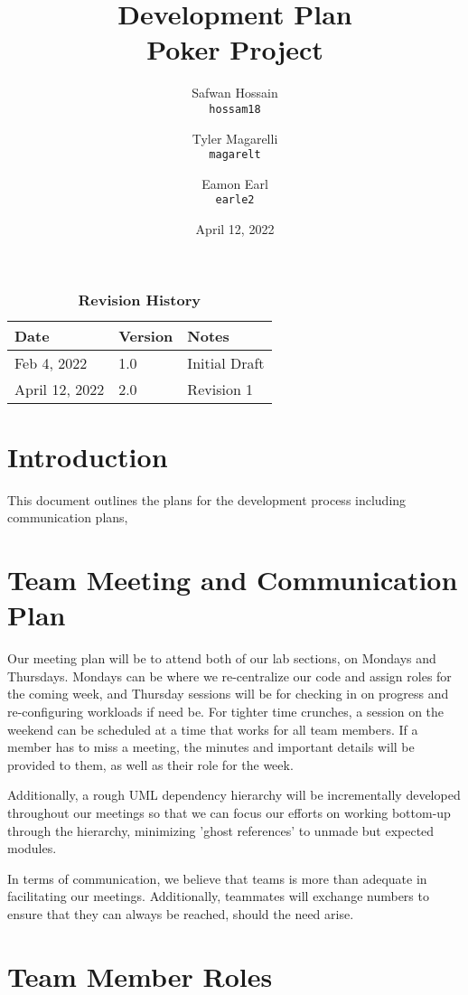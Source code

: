 \documentclass{article}
\title{Development Plan\\Poker Project}
\author{
  Safwan Hossain\\
  \texttt{hossam18}\\
  \and
  Tyler Magarelli\\
  \texttt{magarelt}\\
  \and
  Eamon Earl\\
  \texttt{earle2}
}
\date{April 12, 2022}
\begin{document}
\maketitle
\begin{table}[bp]
\caption{\bf Revision History}
\begin{tabularx}{\textwidth}{p{3cm}p{2cm}X}
\toprule {\bf Date} & {\bf Version} & {\bf Notes}\\
\midrule
Feb 4, 2022 & 1.0 & Initial Draft\\
April 12, 2022 & 2.0 & Revision 1\\
\bottomrule
\end{tabularx}
\end{table}

\newpage
\section{Introduction}
This document outlines the plans for the development process including communication plans,

\section{Team Meeting and Communication Plan}

Our meeting plan will be to attend both of our lab sections, on Mondays and Thursdays. Mondays can be where we re-centralize our code and assign roles for the coming week, and Thursday sessions will be for checking in on progress and re-configuring workloads if need be. For tighter time crunches, a session on the weekend can be scheduled at a time that works for all team members. If a member has to miss a meeting, the minutes and important details will be provided to them, as well as their role for the week. 

Additionally, a rough UML dependency hierarchy will be incrementally developed throughout our meetings so that we can focus our efforts on working bottom-up through the hierarchy, minimizing 'ghost references' to unmade but expected modules.  

In terms of communication, we believe that teams is more than adequate in facilitating our meetings. Additionally, teammates will exchange numbers to ensure that they can always be reached, should the need arise.  


\section{Team Member Roles}
\end{document}

